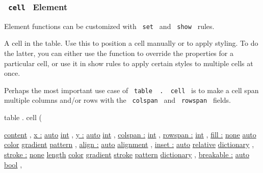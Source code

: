 \subsubsection{\texorpdfstring{\texttt{\ cell\ } {{ Element
}}}{ cell   Element }}\label{definitions-cell}

\label{definitions-cell-element-tooltip}
Element functions can be customized with \texttt{\ set\ } and
\texttt{\ show\ } rules.

A cell in the table. Use this to position a cell manually or to apply
styling. To do the latter, you can either use the function to override
the properties for a particular cell, or use it in show rules to apply
certain styles to multiple cells at once.

Perhaps the most important use case of
\texttt{\ table\ }{\texttt{\ .\ }}\texttt{\ cell\ } is to make a cell
span multiple columns and/or rows with the \texttt{\ colspan\ } and
\texttt{\ rowspan\ } fields.

table { . } { cell } (

{ \href{/docs/reference/foundations/content/}{content} , } {
\hyperref[definitions-cell-parameters-x]{x :}
\href{/docs/reference/foundations/auto/}{auto}
\href{/docs/reference/foundations/int/}{int} , } {
\hyperref[definitions-cell-parameters-y]{y :}
\href{/docs/reference/foundations/auto/}{auto}
\href{/docs/reference/foundations/int/}{int} , } {
\hyperref[definitions-cell-parameters-colspan]{colspan :}
\href{/docs/reference/foundations/int/}{int} , } {
\hyperref[definitions-cell-parameters-rowspan]{rowspan :}
\href{/docs/reference/foundations/int/}{int} , } {
\hyperref[definitions-cell-parameters-fill]{fill :}
\href{/docs/reference/foundations/none/}{none}
\href{/docs/reference/foundations/auto/}{auto}
\href{/docs/reference/visualize/color/}{color}
\href{/docs/reference/visualize/gradient/}{gradient}
\href{/docs/reference/visualize/pattern/}{pattern} , } {
\hyperref[definitions-cell-parameters-align]{align :}
\href{/docs/reference/foundations/auto/}{auto}
\href{/docs/reference/layout/alignment/}{alignment} , } {
\hyperref[definitions-cell-parameters-inset]{inset :}
\href{/docs/reference/foundations/auto/}{auto}
\href{/docs/reference/layout/relative/}{relative}
\href{/docs/reference/foundations/dictionary/}{dictionary} , } {
\hyperref[definitions-cell-parameters-stroke]{stroke :}
\href{/docs/reference/foundations/none/}{none}
\href{/docs/reference/layout/length/}{length}
\href{/docs/reference/visualize/color/}{color}
\href{/docs/reference/visualize/gradient/}{gradient}
\href{/docs/reference/visualize/stroke/}{stroke}
\href{/docs/reference/visualize/pattern/}{pattern}
\href{/docs/reference/foundations/dictionary/}{dictionary} , } {
\hyperref[definitions-cell-parameters-breakable]{breakable :}
\href{/docs/reference/foundations/auto/}{auto}
\href{/docs/reference/foundations/bool/}{bool} , }

